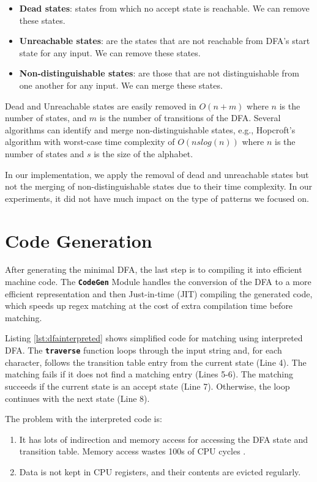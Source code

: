 \begin{itemize}
    \item \textbf{Dead states}: states from which no accept state is reachable. We can remove these states.
    \item  \textbf{Unreachable states}: are the states that are not reachable from DFA's start state for any input. We can remove these states.
    \item \textbf{Non-distinguishable states}: are those that are not distinguishable from one another for any input. We can merge these states.
\end{itemize}

Dead and Unreachable states are easily removed in $O(n + m)$ where $n$ is the number of states, and $m$ is the number of transitions of the DFA. Several algorithms can identify and merge non-distinguishable states, e.g., Hopcroft's algorithm \cite{Hopcroftalgo} with worst-case time complexity of $O(ns log(n))$ where $n$ is the number of states and $s$ is the size of the alphabet.

In our implementation, we apply the removal of dead and unreachable states but not the merging of non-distinguishable states due to their time complexity. In our experiments, it did not have much impact on the type of patterns we focused on.

\section{Code Generation}
After generating the minimal DFA, the last step is to compiling it into efficient machine code. The \texttt{\textbf{CodeGen}} Module handles the conversion of the DFA to a more efficient representation and then Just-in-time (JIT) compiling the generated code, which speeds up regex matching at the cost of extra compilation time before matching.

Listing \ref{lst:dfainterpreted} shows simplified code for matching using interpreted DFA. The \texttt{\textbf{traverse}} function loops through the input string and, for each character, follows the transition table entry from the current state (Line 4). The matching fails if it does not find a matching entry (Lines 5-6). The matching succeeds if the current state is an accept state (Line 7). Otherwise, the loop continues with the next state (Line 8). 

The problem with the interpreted code is:
\begin{enumerate}
    \item It has lots of indirection and memory access for accessing the DFA state and transition table. Memory access wastes 100s of CPU cycles \cite{cpumemgap}.
    \item Data is not kept in CPU registers, and their contents are evicted regularly.
\end{enumerate}

